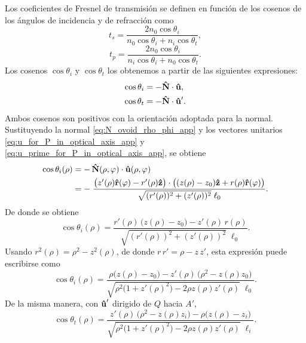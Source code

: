 Los coeficientes de Fresnel de transmisión se definen en función de los cosenos de los ángulos de incidencia y de refracción como
\begin{equation}
t_s
=
\frac{2 n_0 \cos \theta_i}
{n_0 \cos \theta_i + n_i \cos \theta_t},
\label{eq:ts_app}
\end{equation}
\begin{equation}
t_p
=
\frac{2 n_0 \cos \theta_i}
{n_i \cos \theta_i + n_0 \cos \theta_t}.
\label{eq:tp_app}
\end{equation}
Los cosenos $\cos\theta_i$ y $\cos\theta_t$ los obtenemos a partir de las siguientes expresiones:
\begin{align}
  \cos\theta_i &= -\bm{\hat{\mathbf{N}}} \cdot \bm{\hat{\mathbf{u}}},
  \\
  \cos\theta_t &= -\bm{\hat{\mathbf{N}}} \cdot \bm{\hat{\mathbf{u}}}'.
\end{align}
Ambos cosenos son positivos con la orientación adoptada para la normal. Sustituyendo la normal \eqref{eq:N_ovoid_rho_phi_app} y los vectores unitarios \eqref{eq:u_for_P_in_optical_axis_app} y \eqref{eq:u_prime_for_P_in_optical_axis_app}, se obtiene
\begin{align}
\cos\theta_i(\rho)
&=
-\,\bm{\hat{\mathbf{N}}}(\rho,\varphi)\cdot\bm{\hat{\mathbf{u}}}(\rho,\varphi)
\label{eq:cos_theta_i_def_app}
\\
&=
-\;
\frac{
\big(z'(\rho)\bm{\hat{\mathbf{r}}}(\varphi)-r'(\rho)\bm{\hat{\mathbf{z}}}\big)
\cdot
\big((z(\rho)-z_0)\bm{\hat{\mathbf{z}}}+r(\rho)\bm{\hat{\mathbf{r}}}(\varphi)\big)
}
{
\sqrt{(r'(\rho))^2+(z'(\rho))^2}\;
\ell_0
}.
\label{eq:cos_theta_i_closed_app}
\end{align}
De donde se obtiene
\begin{equation}
  \cos\theta_i(\rho)
  =
  \frac{
  r'(\rho)\,\big(z(\rho)-z_0\big)
  -
  z'(\rho)\,r(\rho)
  }
  {
  \sqrt{(r'(\rho))^2+(z'(\rho))^2}\;
  \ell_0
  }.
  \label{eq:cos_theta_i_ovoid_z_and_r}
\end{equation}
Usando $r^2(\rho)=\rho^2-z^2(\rho)$, de donde $r\,r'=\rho-z\,z'$, esta expresión puede escribirse como
\begin{equation}
\cos\theta_i(\rho)
=
\frac{
\rho\big(z(\rho)-z_0\big)
-
z'(\rho)\,\big(\rho^2-z(\rho)z_0\big)
}
{
\sqrt{\rho^2\big(1+z'(\rho)^2\big)-2\rho z(\rho)z'(\rho)}
\;
\ell_0
}.
\label{eq:cos_theta_i_ovoid}
\end{equation}
De la misma manera, con $\bm{\hat{\mathbf{u}}}'$ dirigido de $Q$ hacia $A'$,
\begin{equation}
\cos\theta_t(\rho)
=
\frac{
z'(\rho)\,\big(\rho^2-z(\rho)z_i\big)
-
\rho\big(z(\rho)-z_i\big)
}
{
\sqrt{\rho^2\big(1+z'(\rho)^2\big)-2\rho z(\rho)z'(\rho)}
\;
\ell_i
}.
\label{eq:cos_theta_t_ovoid}
\end{equation}
